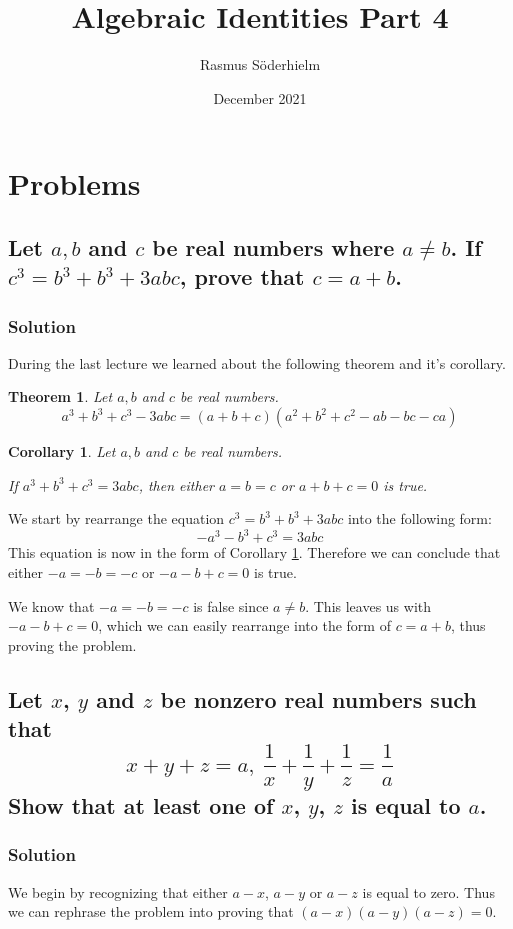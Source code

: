 \documentclass{article}
\title{Algebraic Identities Part 4}
\author{Rasmus Söderhielm}
\date{December 2021}
\newcommand{\solution}{\subsubsection*{\textcolor{MainColor}{Solution}}}
\newcounter{theoremcounter}
\theoremstyle{maintheorem}
\newtheorem{theorem}[theoremcounter]{\textcolor{SubColor}{Theorem}}
\newtheorem{corollary}{\textcolor{SubColor}{Corollary}}
\begin{document}
\linespread{1.5}\selectfont

\maketitle

\section*{\color{MainColor}Problems}

\subsection{
	\normalfont
	Let $a, b$ and $c$ be real numbers where $a \neq b$. If $c^3 = b^3 + b^3 + 3abc$, prove that $c=a+b$.
}

\solution

During the last lecture we learned about the following theorem and it's corollary.
\begin{theorem}\label{thm1}
	Let $a, b$ and $c$ be real numbers.
	\[ a^3 + b^3 + c^3 - 3abc = (a + b + c)(a^2 + b^2 + c^2 - ab - bc - ca) \]
\end{theorem}
\begin{corollary}\label{cor1}
	Let $a, b$ and $c$ be real numbers.

	If $a^3 + b^3 + c^3 = 3abc$, then either $a = b = c$ or $a + b + c = 0$ is true.
\end{corollary}

We start by rearrange the equation $ c^3 = b^3 + b^3 + 3abc $ into the following form:
\[ -a^3 - b^3 + c^3 = 3abc \]
This equation is now in the form of Corollary \ref{cor1}. Therefore we can conclude that either $-a = -b = -c$ or $-a - b + c = 0$ is true.

We know that $ -a = -b = -c $ is false since $a \neq b$. This leaves us with $-a - b + c = 0$, which we can easily rearrange into the form of $c = a + b$, thus proving the problem.

\subsection{
	\normalfont
	Let $x$, $y$ and $z$ be nonzero real numbers such that
	\[x + y + z = a,\ \frac{1}{x} + \frac{1}{y} + \frac{1}{z} = \frac{1}{a}\]
	Show that at least one of $x$, $y$, $z$ is equal to $a$.
}

\solution

We begin by recognizing that either $a - x$, $a - y$ or $a - z$ is equal to zero. Thus we can rephrase the problem into proving that $ (a - x)(a - y)(a - z) = 0 $.
\end{document}
